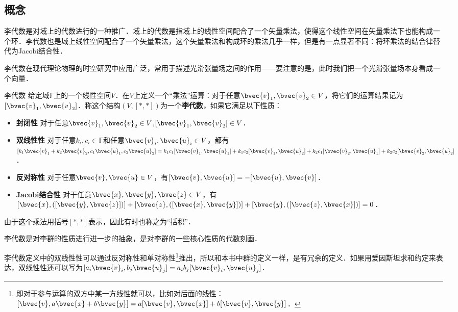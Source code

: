 
\subsection{概念}

李代数是对域上的代数进行的一种推广．域上的代数是指域上的线性空间配合了一个矢量乘法，使得这个线性空间在矢量乘法下也能构成一个环．李代数也是域上线性空间配合了一个矢量乘法，这个矢量乘法和构成环的乘法几乎一样，但是有一点显著不同：将环乘法的结合律替代为Jacobi结合性．

李代数在现代理论物理的时空研究中应用广泛，常用于描述光滑张量场之间的作用——要注意的是，此时我们把一个光滑张量场本身看成一个向量．

\begin{definition}{李代数}
给定域$\mathbb{F}$上的一个线性空间$V$．在$V$上定义一个“乘法”运算：对于任意$\bvec{v}_1, \bvec{v}_2\in V$，将它们的运算结果记为$[\bvec{v}_1, \bvec{v}_2]$．称这个结构$(V, [*, *])$为一个\textbf{李代数}，如果它满足以下性质：
\begin{itemize}
\item \textbf{封闭性} 对于任意$\bvec{v}_1, \bvec{v}_2\in V$,$[\bvec{v}_1, \bvec{v}_2]\in V$．
\item \textbf{双线性性} 对于任意$k_i, c_i\in \mathbb{F}$和任意$\bvec{v}_i, \bvec{u}_i\in V$，都有$[k_1\bvec{v}_1+k_2\bvec{v}_2, c_1\bvec{u}_1, c_2\bvec{u}_2]=k_1c_1[\bvec{v}_1, \bvec{u}_1]+k_1c_2[\bvec{v}_1, \bvec{u}_2]+k_2c_1[\bvec{v}_2, \bvec{u}_1]+k_2c_2[\bvec{v}_2, \bvec{u}_2]$．
\item \textbf{反对称性} 对于任意$\bvec{v}, \bvec{u}\in V$，有$[\bvec{v}, \bvec{u}]=-[\bvec{u}, \bvec{v}]$．
\item \textbf{Jacobi结合性} 对于任意$\bvec{x}, \bvec{y}, \bvec{z}\in V$，有$[\bvec{x}, ([\bvec{y}, \bvec{z}])]+[\bvec{z}, ([\bvec{x}, \bvec{y}])]+[\bvec{y}, ([\bvec{z}, \bvec{x}])]=0$．
\end{itemize}

由于这个乘法用括号$[*, *]$表示，因此有时也称之为“括积”．
\end{definition}

李代数是对李群的性质进行进一步的抽象，是对李群的一些核心性质的代数刻画．

李代数定义中的双线性性可以通过反对称性和单对称性\footnote{即对于参与运算的双方中某一方线性就可以，比如对后面的线性：$[\bvec{v},a\bvec{x}+b\bvec{y}]=a[\bvec{v}, \bvec{x}]+b[\bvec{v}, \bvec{y}]$．}推出，所以和本书中群的定义一样，是有冗余的定义．如果用爱因斯坦求和约定来表达，双线性性还可以写为$[a_i\bvec{v}_i, b_j\bvec{u}_j]=a_ib_j[\bvec{v}_i, \bvec{u}_j]$．

